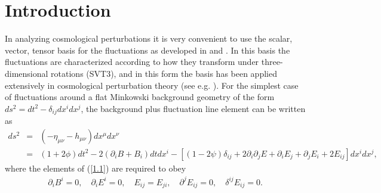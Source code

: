\documentclass[aps,onecolumn,10pt]{revtex4}
\numberwithin{equation}{section}
\numberwithin{equation}{section}
\begin{document}
\maketitle

\section{Introduction}
\label{S1}

In analyzing cosmological perturbations it is very convenient to use the scalar, vector, tensor basis for the fluctuations as developed in  \cite{Lifshitz1946}  and \cite{Bardeen1980}. In this basis the fluctuations are characterized according to how they transform under three-dimensional rotations (SVT3), and in this form the basis  has been applied extensively in cosmological perturbation theory (see e.g. \cite{Kodama1984,Bertschinger1996,Ellis2012}). For the simplest case of fluctuations around a flat Minkowski background geometry of the form $ds^2=dt^2-\delta_{ij}dx^idx^j$, the background plus fluctuation line element can be written as 
%
\begin{eqnarray}
ds^2 &=&(-\eta_{\mu\nu}-h_{\mu\nu})dx^{\mu}dx^{\nu}
\nonumber\\
&=&(1+2\phi) dt^2 -2(\partial_i B +B_i)dt dx^i - [(1-2\psi)\delta_{ij} +2\partial_i\partial_j E + \partial_i E_j + \partial_j E_i + 2E_{ij}]dx^i dx^j,
\label{1.1}
\end{eqnarray}
%
where the elements of (\ref{1.1}) are required to obey
%
\begin{eqnarray}
\partial_i B^i = 0,\quad \partial_i E^i = 0, \quad E_{ij}=E_{ji},\quad \partial^jE_{ij} = 0, \quad \delta^{ij}E_{ij} = 0.
\label{1.2}
\end{eqnarray}
%
\end{document}
